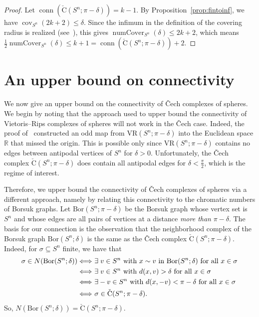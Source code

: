 \documentclass[11 pt,a4paper,twoside,reqno]{amsart}
\theoremstyle{definition}
\def\R{{\mathbb R}}
\newcommand{\vr}[2]{\mathrm{VR}(#1;#2)}
\newcommand{\cech}[2]{\mathrm{\check{C}}(#1;#2)}
\DeclareMathOperator{\conn}{conn}
\DeclareMathOperator{\cov}{cov}
\DeclareMathOperator{\numcov}{numCover}
\newcommand{\bor}[2]{\mathrm{Bor}(#1;#2)}
\begin{document}
\begin{proof}
Let $\conn(\cech{S^n}{\pi-\delta})=k-1$.
By Proposition~\ref{prop:fintoinf}, we have $\cov_{S^n}(2k+2)\le \delta$.
Since the infimum in the definition of the covering radius is realized (see~\cite[Lemma~3.1]{ABV}), this gives $\numcov_{S^n}(\delta)\le 2k+2$, which means $\frac{1}{2}\numcov_{S^n}(\delta)\le k+1=\conn(\cech{S^n}{\pi-\delta})+2$.
\end{proof}



\section{An upper bound on connectivity}
\label{sec:chromatic}

We now give an upper bound on the connectivity of \v{C}ech complexes of spheres.
We begin by noting that the approach used to upper bound the connectivity of Vietoris--Rips complexes of spheres will not work in the \v{C}ech case.
Indeed, the proof of~\cite[Claim~4.2]{ABV} constructed an odd map from $\vr{S^n}{\pi-\delta}$ into the Euclidean space $\R$ that missed the origin.
This is possible only since $\vr{S^n}{\pi-\delta}$ contains no edges between antipodal vertices of $S^n$ for $\delta>0$.
Unfortunately, the \v{C}ech complex $\cech{S^n}{\pi-\delta}$ does contain all antipodal edges for $\delta<\frac{\pi}{2}$, which is the regime of interest.

Therefore, we upper bound the connectivity of \v{C}ech complexes of spheres via a different approach, namely by relating this connectivity to the chromatic numbers of Borsuk graphs.
Let $\bor{S^n}{\pi-\delta}$ be the Borsuk graph whose vertex set is $S^n$ and whose edges are all pairs of vertices at a distance \emph{more than} $\pi-\delta$.
The basis for our connection is the observation that the neighborhood complex of the Borsuk graph $\bor{S^n}{\delta}$ is the same as the \v{C}ech complex $\cech{S^n}{\pi-\delta}$.
Indeed, for $\sigma\subseteq S^n$ finite, we have that
\begin{align*}
\sigma\in N(\bor{S^n}{\delta})
\Longleftrightarrow\ & \exists \hspace{1mm} v\in S^n \text{ with }x\sim v\text{ in }\bor{S^n}{\delta} \text{ for all } x\in\sigma \\
\Longleftrightarrow\ & \exists \hspace{1mm}v\in S^n \text{ with }d(x,v)> \delta \text{ for all } x\in\sigma \\
\Longleftrightarrow\ & \exists -v\in S^n \text{ with }d(x,-v)<\pi-\delta \text{ for all } x\in\sigma \\
\Longleftrightarrow\ & \sigma \in \cech{S^n}{\pi-\delta}.
\end{align*}
So, $N(\bor{S^n}{\delta})=\cech{S^n}{\pi-\delta}$.
\end{document}
